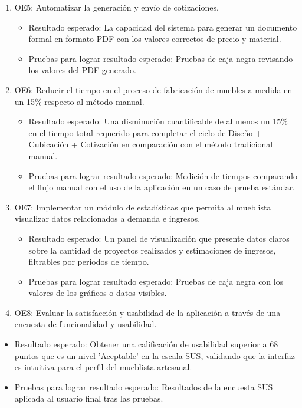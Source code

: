 ﻿\documentclass{iccmemoria}
\begin{document}
\begin{enumerate}
\item OE5: Automatizar la generación y envío de cotizaciones.
\begin{itemize}
    \item Resultado esperado: La capacidad del sistema para generar un documento formal en formato PDF con los valores correctos de precio y material.
    \item Pruebas para lograr resultado esperado: Pruebas de caja negra revisando los valores del PDF generado.
\end{itemize}

\item OE6: Reducir el tiempo en el proceso de fabricación de muebles a medida en un 15\% respecto al método manual.  
\begin{itemize}
    \item Resultado esperado: Una disminución cuantificable de al menos un 15\% en el tiempo total requerido para completar el ciclo de Diseño + Cubicación + Cotización en comparación con el método tradicional manual.
    \item Pruebas para lograr resultado esperado: Medición de tiempos comparando el flujo manual con el uso de la aplicación en un caso de prueba estándar.
\end{itemize}

\item OE7: Implementar un módulo de estadísticas que permita al mueblista visualizar datos relacionados a demanda e ingresos.
\begin{itemize}
    \item Resultado esperado: Un panel de visualización que presente datos claros sobre la cantidad de proyectos realizados y estimaciones de ingresos, filtrables por periodos de tiempo.
    \item Pruebas para lograr resultado esperado: Pruebas de caja negra con los valores de los gráficos o datos visibles.
\end{itemize}

\item OE8: Evaluar la satisfacción y usabilidad de la aplicación a través de una encuesta de funcionalidad y usabilidad.
\end{enumerate}
\begin{itemize}
    \item Resultado esperado: Obtener una calificación de usabilidad superior a 68 puntos que es un nivel 'Aceptable'  en la escala SUS, validando que la interfaz es intuitiva para el perfil del mueblista artesanal.
    \item Pruebas para lograr resultado esperado: Resultados de la encuesta SUS aplicada al usuario final tras las pruebas.
\end{itemize}
\end{document}
